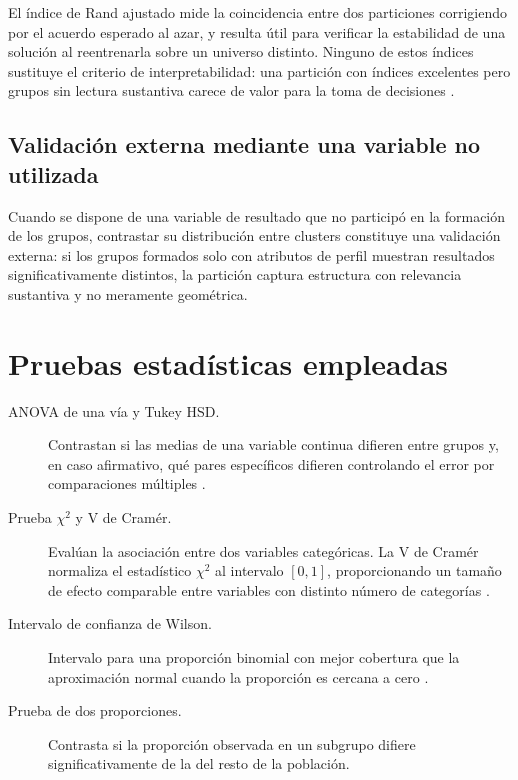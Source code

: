 El índice de Rand ajustado mide la coincidencia entre dos particiones corrigiendo
por el acuerdo esperado al azar, y resulta útil para verificar la estabilidad de una
solución al reentrenarla sobre un universo distinto. Ninguno de estos índices
sustituye el criterio de interpretabilidad: una partición con índices excelentes
pero grupos sin lectura sustantiva carece de valor para la toma de decisiones
\cite{kaufman1990finding}.

\subsection{Validación externa mediante una variable no utilizada}

Cuando se dispone de una variable de resultado que no participó en la formación de
los grupos, contrastar su distribución entre clusters constituye una validación
externa: si los grupos formados solo con atributos de perfil muestran resultados
significativamente distintos, la partición captura estructura con relevancia
sustantiva y no meramente geométrica.

\section{Pruebas estadísticas empleadas}

\begin{description}
    \item[ANOVA de una vía y Tukey HSD.] Contrastan si las medias de una variable
    continua difieren entre grupos y, en caso afirmativo, qué pares específicos
    difieren controlando el error por comparaciones múltiples
    \cite{tukey1949comparing}.
    \item[Prueba $\chi^2$ y V de Cramér.] Evalúan la asociación entre dos variables
    categóricas. La V de Cramér normaliza el estadístico $\chi^2$ al intervalo
    $[0,1]$, proporcionando un tamaño de efecto comparable entre variables con
    distinto número de categorías \cite{cramer1946mathematical}.
    \item[Intervalo de confianza de Wilson.] Intervalo para una proporción binomial
    con mejor cobertura que la aproximación normal cuando la proporción es cercana a
    cero \cite{wilson1927probable}.
    \item[Prueba de dos proporciones.] Contrasta si la proporción observada en un
    subgrupo difiere significativamente de la del resto de la población.
\end{description}

